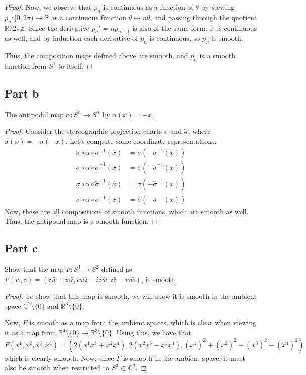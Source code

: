 \documentclass[fontsize=11pt]{scrartcl} %
\numberwithin{equation}{section} %
\numberwithin{figure}{section} %
\numberwithin{table}{section} %
\newcommand{\R}{\mathbb{R}}
\newcommand{\Z}{\mathbb{Z}}
\newcommand{\C}{\mathbb{C}}
\begin{document}
\begin{proof}
Now, we observe that $p_n$ is continuous as a function of $\theta$ by viewing $p_n:[0,2\pi)\to\R$
as a continuous function $\theta\mapsto n\theta$, and passing through the quotient $\R/{2\pi\Z}$.
Since the derivative $p_n' = np_{n-1}$ is also of the same form, it is continuous as well,
and by induction each derivative of $p_n$ is continuous, so $p_n$ is smooth.

Thus, the composition maps defined above are smooth, and $p_n$ is a smooth function from
$S^1$ to itself.
\end{proof}

\subsection*{Part b}
The antipodal map $\alpha:S^n\to S^n$ by $\alpha(x) = -x$.
\\
\begin{proof}
Consider the stereographic projection charts $\sigma$ and $\tilde{\sigma}$, where
$\tilde{\sigma}(x) = -\sigma(-x)$. Let's compute some coordinate representations:
\[
\begin{aligned}
\sigma\circ\alpha\circ\sigma^{-1}(x) &= \sigma(-\sigma^{-1}(x))\\
\tilde{\sigma}\circ\alpha\circ\tilde{\sigma}^{-1}(x) &= \tilde{\sigma}(-\tilde{\sigma}^{-1}(x))\\
\sigma\circ\alpha\circ\tilde{\sigma}^{-1}(x) &= \sigma(-\tilde{\sigma}^{-1}(x))\\
\tilde{\sigma}\circ\alpha\circ\sigma^{-1}(x) &= \tilde{\sigma}(-\sigma^{-1}(x))
\end{aligned}
\]
Now, these are all compositions of smooth functions, which are smooth as well.
Thus, the antipodal map is a smooth function. 
\end{proof}

\subsection*{Part c}
Show that the map $F:S^3\to S^2$ defined as $F(w,z) = (z\bar{w} + w\bar{z}, iw\bar{z} - iz\bar{w}, z\bar{z} - w\bar{w})$,
is smooth.
\\
\begin{proof}
To show that this map is smooth, we will show it is smooth in the ambient space $\C^2\setminus\{0\}$
and $\R^3\setminus\{0\}$. 

Now, $F$ is smooth as a map from the ambient spaces, which is clear when viewing it as a
map from $\R^4\setminus\{0\}\to\R^3\setminus\{0\}$. Using this, we have that
\[
F(x^1,x^2,x^3,x^4) = (2(x^1x^3 + x^2x^4),2(x^2x^3 - x^1x^4), (x^1)^2 + (x^2)^2 - (x^3)^2 - (x^4)^2)
\] 
which is clearly smooth. Now, since $F$ is smooth in the ambient space, it must also be smooth
when restricted to $S^3\subset \C^2$.
\end{proof}
\end{document}
